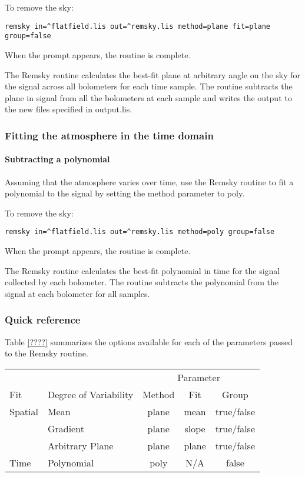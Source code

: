\documentclass[twoside,11pt]{article}
\renewcommand{\_}{\texttt{\symbol{95}}}
\begin{document}
To remove the sky:
\begin{verbatim}
remsky in=^flatfield.lis out=^remsky.lis method=plane fit=plane group=false
\end{verbatim}
When the prompt appears, the routine is complete.

The Remsky routine calculates the best-fit plane at arbitrary angle on
the sky for the signal across all bolometers for each time sample. The
routine subtracts the plane in signal from all the bolometers at each
sample and writes the output to the new files specified in output.lis.

\subsubsection{Fitting the atmosphere in the time domain}

\paragraph{Subtracting a polynomial}

Assuming that the atmosphere varies over time, use the Remsky routine
to fit a polynomial to the signal by setting the method parameter to
poly.

To remove the sky:
\begin{verbatim}
remsky in=^flatfield.lis out=^remsky.lis method=poly group=false
\end{verbatim}
When the prompt appears, the routine is complete.


The Remsky routine calculates the best-fit polynomial in time for the
signal collected by each bolometer. The routine subtracts the
polynomial from the signal at each bolometer for all samples.

\subsubsection{Quick reference}

Table \ref{????} summarizes the options available for each of the
parameters passed to the Remsky routine.

\begin{table}
\begin{tabular}{llccc}
\hline
        &                        & \multicolumn{3}{c}{Parameter} \\
Fit     & Degree of Variability  & Method  & Fit & Group\\
\hline
Spatial & Mean            & plane & mean  & true/false \\
        & Gradient        & plane & slope & true/false \\
        & Arbitrary Plane & plane & plane & true/false \\
Time    & Polynomial      & poly  & N/A   &    false \\
\hline
\end{tabular}
\end{table}
\end{document}
